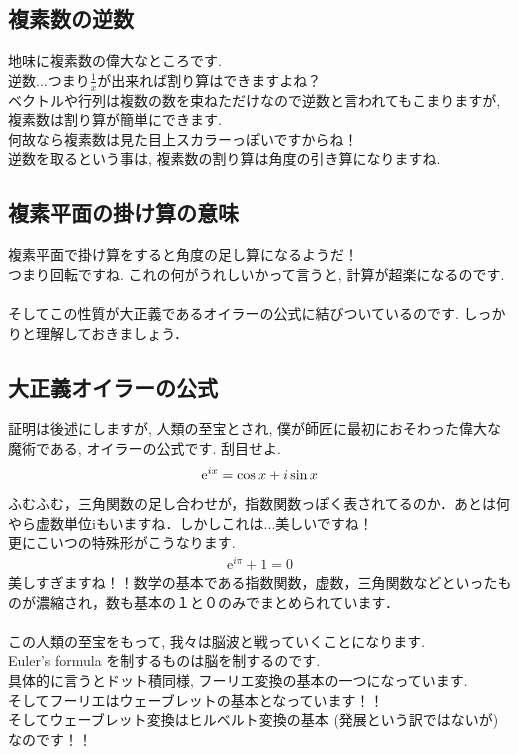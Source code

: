 \documentclass[11pt,a4paper]{jreport}
\begin{document}
\subsection{複素数の逆数}
地味に複素数の偉大なところです.\\
逆数...つまり$\frac{1}{x}$が出来れば割り算はできますよね？\\
ベクトルや行列は複数の数を束ねただけなので逆数と言われてもこまりますが, 複素数は割り算が簡単にできます. \\
何故なら複素数は見た目上スカラーっぽいですからね！\\
逆数を取るという事は, 複素数の割り算は角度の引き算になりますね.\\

\subsection{複素平面の掛け算の意味}
複素平面で掛け算をすると角度の足し算になるようだ！\\
つまり回転ですね. これの何がうれしいかって言うと, 計算が超楽になるのです.\\
\\

そしてこの性質が大正義であるオイラーの公式に結びついているのです. しっかりと理解しておきましょう．
\subsection{大正義オイラーの公式}
証明は後述にしますが, 人類の至宝とされ, 僕が師匠に最初におそわった偉大な魔術である, オイラーの公式です. 刮目せよ.\\
\begin{eqnarray}
\mathrm{e}^{ix} = \cos x + \mathstrut i\sin x
\label{eq:euler}
\end{eqnarray}
ふむふむ，三角関数の足し合わせが，指数関数っぽく表されてるのか．あとは何やら虚数単位iもいますね．しかしこれは...美しいですね！\\
更にこいつの特殊形がこうなります.\\
\begin{eqnarray}
\mathrm{e}^{i\pi} + 1 = 0
\end{eqnarray}
美しすぎますね！！数学の基本である指数関数，虚数，三角関数などといったものが濃縮され，数も基本の１と０のみでまとめられています．\\
\\
この人類の至宝をもって, 我々は脳波と戦っていくことになります.\\
Euler's formula を制するものは脳を制するのです.\\
具体的に言うとドット積同様, フーリエ変換の基本の一つになっています. \\
そしてフーリエはウェーブレットの基本となっています！！\\
そしてウェーブレット変換はヒルベルト変換の基本 (発展という訳ではないが) なのです！！\\
\end{document}
